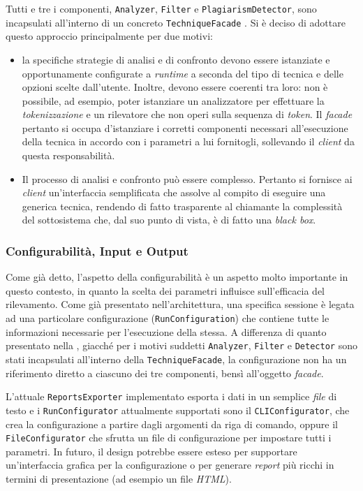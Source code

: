 \newpage

Tutti e tre i componenti, \texttt{Analyzer}, \texttt{Filter} e \texttt{PlagiarismDetector}, sono incapsulati all'interno di un concreto \texttt{TechniqueFacade} \cite{gof}.
%
Si è deciso di adottare questo approccio principalmente per due motivi:
\begin{itemize}
    \item la specifiche strategie di analisi e di confronto devono essere istanziate e opportunamente configurate a \textit{runtime} a seconda del tipo di tecnica e delle opzioni scelte dall'utente. Inoltre, devono essere coerenti tra loro: non è possibile, ad esempio, poter istanziare un analizzatore per effettuare la \textit{tokenizzazione} e un rilevatore che non operi sulla sequenza di \textit{token}. Il \textit{facade} pertanto si occupa d'istanziare i corretti componenti necessari all'esecuzione della tecnica in accordo con i parametri a lui fornitogli, sollevando il \textit{client} da questa responsabilità.
    \item Il processo di analisi e confronto può essere complesso. Pertanto si fornisce ai \textit{client} un'interfaccia semplificata che assolve al compito di eseguire una generica tecnica, rendendo di fatto trasparente al chiamante la complessità del sottosistema che, dal suo punto di vista, è di fatto una \textit{black box}.
\end{itemize}

\subsubsection*{Configurabilità, Input e Output}

Come già detto, l'aspetto della configurabilità è un aspetto molto importante in questo contesto, in quanto la scelta dei parametri influisce sull'efficacia del rilevamento.
%
Come già presentato nell'architettura, una specifica sessione è legata ad una particolare configurazione (\texttt{RunConfiguration}) che contiene tutte le informazioni necessarie per l'esecuzione della stessa.
%
A differenza di quanto presentato nella , giacché per i motivi suddetti \texttt{Analyzer}, \texttt{Filter} e \texttt{Detector} sono stati incapsulati all'interno della \texttt{TechniqueFacade}, la configurazione non ha un riferimento diretto a ciascuno dei tre componenti, bensì all'oggetto \textit{facade}.

L'attuale \texttt{ReportsExporter} implementato esporta i dati in un semplice \textit{file} di testo e i \texttt{RunConfigurator} attualmente supportati sono il \texttt{CLIConfigurator}, che crea la configurazione a partire dagli argomenti da riga di comando, oppure il \texttt{FileConfigurator} che sfrutta un file di configurazione per impostare tutti i parametri.
%
In futuro, il design potrebbe essere esteso per supportare un'interfaccia grafica per la configurazione o per generare \textit{report} più ricchi in termini di presentazione (ad esempio un file \textit{HTML}).

